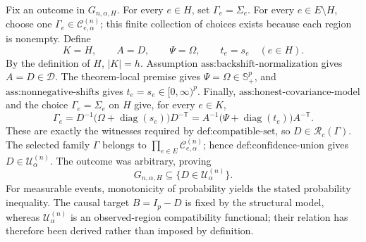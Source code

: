 Fix an outcome in \(G_{n,\alpha,H}\). For every \(e\in H\), set \(\Gamma_e=\Sigma_e\). For every \(e\in E\setminus H\), choose one \(\Gamma_e\in\mathcal C^{(n)}_{e,\alpha}\); this finite collection of choices exists because each region is nonempty. Define
\[
K=H,\qquad A=D,\qquad \Psi=\Omega,
\qquad t_e=s_e\quad(e\in H).
\]
By the definition of \(H\), \(|K|=h\). Assumption \(\text{ass:backshift-normalization}\) gives \(A=D\in\mathcal D\). The theorem-local premise gives \(\Psi=\Omega\in\mathbb S_+^p\), and \(\text{ass:nonnegative-shifts}\) gives \(t_e=s_e\in[0,\infty)^p\). Finally, \(\text{ass:honest-covariance-model}\) and the choice \(\Gamma_e=\Sigma_e\) on \(H\) give, for every \(e\in K\),
\[
\Gamma_e
=D^{-1}\bigl(\Omega+\operatorname{diag}(s_e)\bigr)D^{-\mathsf T}
=A^{-1}\bigl(\Psi+\operatorname{diag}(t_e)\bigr)A^{-\mathsf T}.
\]
These are exactly the witnesses required by \(\text{def:compatible-set}\), so \(D\in\mathcal R_c(\Gamma)\). The selected family \(\Gamma\) belongs to \(\prod_{e\in E}\mathcal C^{(n)}_{e,\alpha}\); hence \(\text{def:confidence-union}\) gives \(D\in\mathcal U^{(n)}_\alpha\). The outcome was arbitrary, proving
\[
G_{n,\alpha,H}\subseteq\{D\in\mathcal U^{(n)}_\alpha\}.
\]
For measurable events, monotonicity of probability yields the stated probability inequality. The causal target \(B=I_p-D\) is fixed by the structural model, whereas \(\mathcal U^{(n)}_\alpha\) is an observed-region compatibility functional; their relation has therefore been derived rather than imposed by definition.